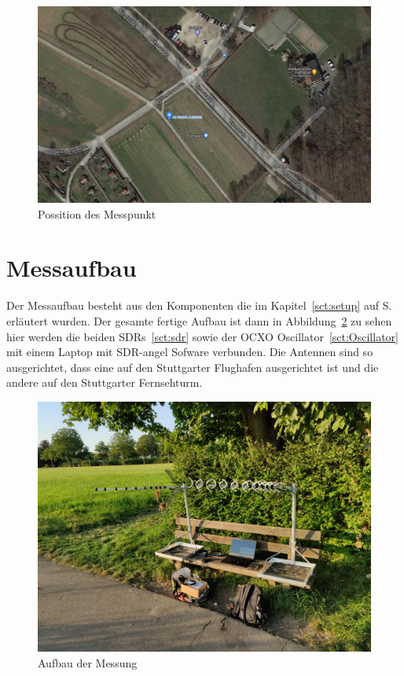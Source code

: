 \begin{figure}
    \centering
    \includegraphics[width=\textwidth]{images/Maps_Messpunkt.png}
    \caption{Possition des Messpunkt}\label{fig:Maps}
\end{figure}

\section{Messaufbau}
Der Messaufbau besteht aus den Komponenten die im Kapitel~\ref{sct:setup} auf S.\pageref{sct:setup} erläutert wurden. Der gesamte fertige Aufbau ist dann in Abbildung~\ref{fig:Messaufbau} zu sehen hier werden die beiden SDRs~\ref{sct:sdr} sowie der OCXO Oscillator~\ref{sct:Oscillator} mit einem Laptop mit SDR-angel Sofware verbunden. Die Antennen sind so ausgerichtet, dass eine auf den Stuttgarter Flughafen ausgerichtet ist und die andere auf den Stuttgarter Fernsehturm. 

\begin{figure}
    \centering
    \includegraphics[width=\textwidth]{images/Messaufbau.jpg}
    \caption{Aufbau der Messung}\label{fig:Messaufbau}
\end{figure}
